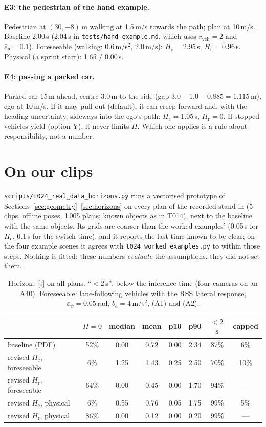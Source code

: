 \documentclass[11pt]{article}
\theoremstyle{definition}
\theoremstyle{remark}
\newcommand{\Hc}{H_{\mathrm{c}}}
\newcommand{\Hr}{H_{\mathrm{r}}}
\begin{document}
\paragraph{E3: the pedestrian of the hand example.} Pedestrian at $(30,-8)$\,m walking at 1.5\,m/s
towards the path; plan at 10\,m/s. Baseline 2.00\,s (2.04\,s in \texttt{tests/hand\_example.md}, which
uses $r_{\mathrm{veh}}=2$ and $\bar e_\theta=0.1$). Foreseeable (walking: 0.6\,m/s$^2$, 2.0\,m/s):
$\Hc=2.95$\,s, $\Hr=0.96$\,s. Physical (a sprint start): 1.65 / 0.00\,s.

\paragraph{E4: passing a parked car.} Parked car 15\,m ahead, centre 3.0\,m to the side (gap
$3.0-1.0-0.885=1.115$\,m), ego at 10\,m/s. If it may pull out (default), it can creep forward and, with the
heading uncertainty, sideways into the ego's path: $\Hc=1.05$\,s, $\Hr=0$. If stopped vehicles yield
(option Y), it never limits $H$. Which one applies is a rule about responsibility, not a number.

\section{On our clips}\label{sec:clips}
\texttt{scripts/t024\_real\_data\_horizons.py} runs a vectorised prototype of Sections~\ref{sec:geometry}--\ref{sec:horizons}
on every plan of the recorded stand-in (5 clips, offline poses, 1\,005 plans; known objects as in T014),
next to the baseline with the same objects. Its grids are coarser than the worked examples' (0.05\,s for
$\Hc$, 0.1\,s for the switch time), and it reports the last time known to be clear; on the four example
scenes it agrees with \texttt{t024\_worked\_examples.py} to within those steps. Nothing is fitted:
these numbers \emph{evaluate} the assumptions, they did not set them.

\begin{table}[h]
\centering
\begin{tabular}{lccccccc}
\toprule
 & $H=0$ & median & mean & p10 & p90 & $<2$\,s & capped \\
\midrule
baseline (PDF) & 52\% & 0.00 & 0.72 & 0.00 & 2.34 & 87\% & 6\% \\
revised $\Hc$, foreseeable & 6\% & 1.25 & 1.43 & 0.25 & 2.50 & 70\% & 10\% \\
revised $\Hr$, foreseeable & 64\% & 0.00 & 0.45 & 0.00 & 1.70 & 94\% & --- \\
revised $\Hc$, physical & 6\% & 0.55 & 0.76 & 0.05 & 1.75 & 99\% & 5\% \\
revised $\Hr$, physical & 86\% & 0.00 & 0.12 & 0.00 & 0.20 & 99\% & --- \\
\bottomrule
\end{tabular}
\caption{Horizons [s] on all plans. ``$<2$\,s'': below the inference time (four cameras on an A40).
Foreseeable: lane-following vehicles with the RSS lateral response, $\varepsilon_\psi=0.05$\,rad,
$b_e=4$\,m/s$^2$, (A1) and (A2).}
\label{tab:clips}
\end{table}
\end{document}
